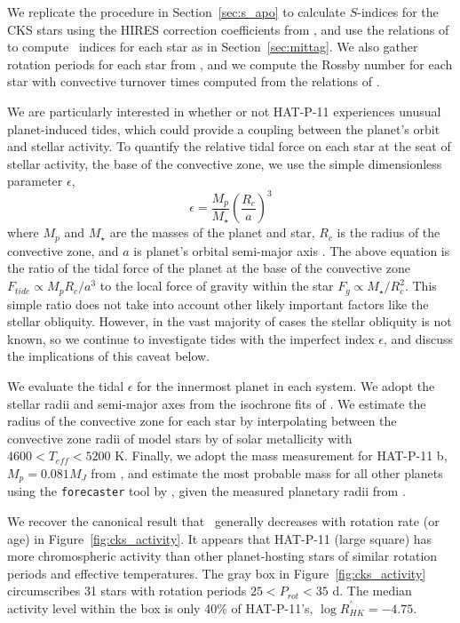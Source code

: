 We replicate the procedure in Section~\ref{sec:s_apo} to calculate $S$-indices for the CKS stars using the HIRES correction coefficients from \citet{Isaacson2010}, and use the relations of \citet{Mittag2013} to compute \rprime\ indices for each star as in Section~\ref{sec:mittag}. We also gather rotation periods for each star from \citet{Mazeh2015}, and we compute the Rossby number for each star with convective turnover times computed from the relations of \citet{Wright2011}.

We are particularly interested in whether or not HAT-P-11 experiences unusual planet-induced tides, which could provide a coupling between the planet's orbit and stellar activity. To quantify the relative tidal force on each star at the seat of stellar activity, the base of the convective zone, we use the simple dimensionless parameter $\epsilon$, 
\begin{equation}
\epsilon = \frac{M_p}{M_\star} \left( \frac{R_c}{a}\right)^3
\end{equation}
where $M_p$ and $M_\star$ are the masses of the planet and star, $R_c$ is the radius of the convective zone, and $a$ is planet's orbital semi-major axis \citep{Ogilvie2014}. The above equation is the ratio of the tidal force of the planet at the base of the convective zone $F_{tide} \propto M_p R_c / a^3$ to the local force of gravity within the star $F_g \propto M_\star / R_c^2$. This simple ratio does not take into account other likely important factors like the stellar obliquity. However, in the vast majority of cases the stellar obliquity is not known, so we continue to investigate tides with the imperfect index $\epsilon$, and discuss the implications of this caveat below.

We evaluate the tidal $\epsilon$ for the innermost planet in each system. We adopt the stellar radii and semi-major axes from the isochrone fits of \citet{Johnson2017}. We estimate the radius of the convective zone for each star by interpolating between the convective zone radii of model stars by \citet{vanSaders2012} of solar metallicity with $4600<T_{eff}<5200$ K. Finally, we adopt the mass measurement for HAT-P-11 b, $M_p=0.081 M_J$ from \citet{Bakos2010}, and estimate the most probable mass for all other planets using the \texttt{forecaster} tool by \citet{Chen2017}, given the measured planetary radii from \citet{Johnson2017}.

We recover the canonical result that \rprime\ generally decreases with rotation rate (or age) in Figure~\ref{fig:cks_activity}. It appears that HAT-P-11 (large square) has more chromospheric activity than other planet-hosting stars of similar rotation periods and effective temperatures. The gray box in Figure~\ref{fig:cks_activity} circumscribes 31 stars with rotation periods $25 < P_{rot} < 35$ d. The median activity level within the box is only 40\% of HAT-P-11's, $\log R^\prime_{HK} = -4.75$.

